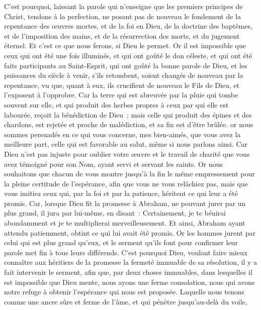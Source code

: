 \begin{multicols}{2}
\VerseOne{}C'est pourquoi, laissant la parole qui n'enseigne que les premiers principes de Christ, tendons à la perfection, ne posant pas de nouveau le fondement de la repentance des œuvres mortes, et de la foi en Dieu,
de la doctrine des baptêmes, et de l'imposition des mains, et de la résurrection des morts, et du jugement éternel.
Et c'est ce que nous ferons, si Dieu le permet.
Or il est impossible que ceux qui ont été une fois illuminés, et qui ont goûté le don céleste, et qui ont été faits participants au Saint-Esprit,
qui ont goûté la bonne parole de Dieu, et les puissances du siècle à venir,
s'ils retombent, soient changés de nouveau par la repentance, vu que, quant à eux, ils crucifient de nouveau le Fils de Dieu, et l'exposent à l'opprobre.
Car la terre qui est abreuvée par la pluie qui tombe souvent sur elle, et qui produit des herbes propres à ceux par qui elle est labourée, reçoit la bénédiction de Dieu~;
mais celle qui produit des épines et des chardons, est rejetée et proche de malédiction, et sa fin est d'être brûlée.
or nous sommes persuadés en ce qui vous concerne, mes bien-aimés, que vous avez la meilleure part, celle qui est favorable au salut, même si nous parlons ainsi.
Car Dieu n'est pas injuste pour oublier votre œuvre et le travail de charité que vous avez témoigné pour son Nom, ayant servi et servant les saints.
Or nous souhaitons que chacun de vous montre jusqu'à la fin le même empressement pour la pleine certitude de l'espérance,
afin que vous ne vous relâchiez pas, mais que vous imitiez ceux qui, par la foi et par la patience, héritent ce qui leur a été promis.
Car, lorsque Dieu fit la promesse à Abraham, ne pouvant jurer par un plus grand, il jura par lui-même,
en disant~: Certainement, je te bénirai abondamment et je te multiplierai merveilleusement.
Et ainsi, Abraham ayant attendu patiemment, obtint ce qui lui avait été promis.
Or les hommes jurent par celui qui est plus grand qu'eux, et le serment qu'ils font pour confirmer leur parole met fin à tous leurs différends.
C'est pourquoi Dieu, voulant faire mieux connaître aux héritiers de la promesse la fermeté immuable de sa résolution, il y a fait intervenir le serment,
afin que, par deux choses immuables, dans lesquelles il est impossible que Dieu mente, nous ayons une ferme consolation, nous qui avons notre refuge à obtenir l'espérance qui nous est proposée.
Laquelle nous tenons comme une ancre sûre et ferme de l'âme, et qui pénètre jusqu'au-delà du voile,

\end{multicols}
